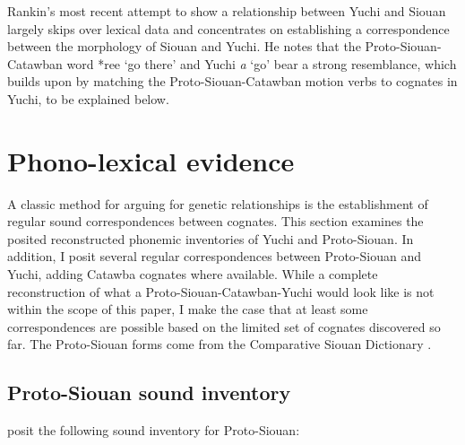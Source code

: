 \documentclass[output=paper]{LSP/langsci}
\begin{document}
Rankin's \citeyear{Rankin1998scy} most recent attempt to show a relationship between Yuchi and Siouan largely skips over lexical data and concentrates on establishing a correspondence between the morphology of Siouan and Yuchi. He notes that the Proto-Siouan-Catawban word *ree `go there' and Yuchi \emph{\textbeltl a} `go' bear a strong resemblance, which \citet{Kasak2012,Kasak2013} builds upon by matching the Proto-Siouan-Catawban motion verbs to cognates in Yuchi, to be explained below.

\section{Phono-lexical evidence}\label{sec:kasak:4}

A classic method for arguing for genetic relationships is the establishment of regular sound correspondences between cognates. This section examines the posited reconstructed phonemic inventories of Yuchi and Proto-Siouan. In addition, I posit several regular correspondences between Proto-Siouan and Yuchi, adding Catawba cognates where available. While a complete reconstruction of what a Proto-Siouan-Catawban-Yuchi would look like is not within the scope of this paper, I make the case that at least some correspondences are possible based on the limited set of cognates discovered so far. The Proto-Siouan forms come from the Comparative Siouan Dictionary \citep{Rankinetal2015AccessSeptember}.

\subsection{Proto-Siouan sound inventory}

\citet{RankinetalND} posit the following sound inventory for Proto-Siouan:
\end{document}
